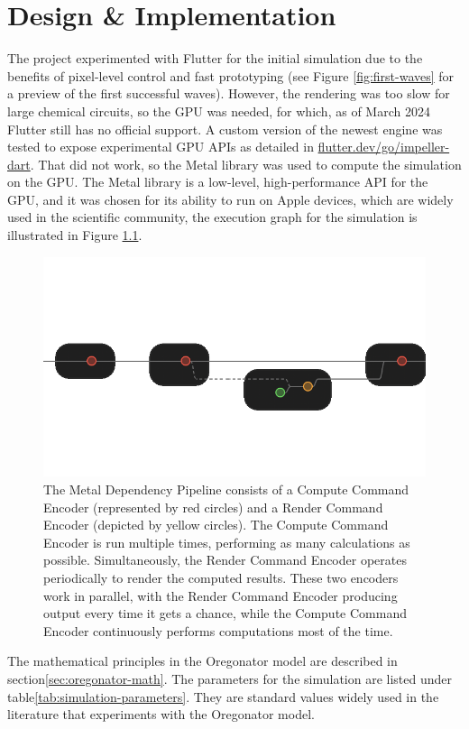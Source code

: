 \chapter{Design \& Implementation}
The project experimented with Flutter for the initial simulation due to the benefits of pixel-level control and fast prototyping (see Figure \ref{fig:first-waves} for a preview of the first successful waves). However, the rendering was too slow for large chemical circuits, so the GPU was needed, for which, as of March 2024 Flutter still has no official support. A custom version of the newest engine was tested to expose experimental GPU APIs as detailed in \href{flutter.dev/go/impeller-dart}{flutter.dev/go/impeller-dart}.
That did not work, so the Metal library was used to compute the simulation on the GPU. 
The Metal library is a low-level, high-performance API for the GPU, and it was chosen for its ability to run on Apple devices, which are widely used in the scientific community, the execution graph for the simulation is illustrated in Figure \ref{fig:metal-dependency-pipline}.

\begin{figure}
    \centering
    \includegraphics[width=0.5\linewidth]{metal-pipeline.png}
    \caption{The Metal Dependency Pipeline consists of a Compute Command Encoder (represented by red circles) and a Render Command Encoder (depicted by yellow circles). The Compute Command Encoder is run multiple times, performing as many calculations as possible. Simultaneously, the Render Command Encoder operates periodically to render the computed results. These two encoders work in parallel, with the Render Command Encoder producing output every time it gets a chance, while the Compute Command Encoder continuously performs computations most of the time.}
    \label{fig:metal-dependency-pipline}
\end{figure}


The mathematical principles in the Oregonator model are described in section\ref{sec:oregonator-math}.
The parameters for the simulation are listed under table\ref{tab:simulation-parameters}. 
They are standard values widely used in the literature that experiments with the Oregonator model.



